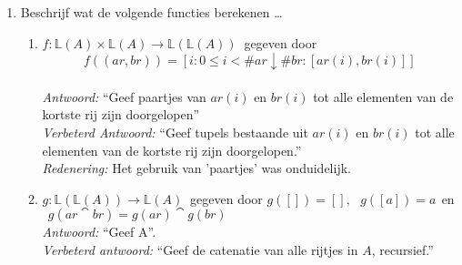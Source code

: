 
\begin{enumerate}

\item Beschrijf wat de volgende functies berekenen \ldots
\begin{enumerate}

    \item $f: \mathbb{L}(A) \times \mathbb{L}(A)\rightarrow \mathbb{L}(\mathbb{L}(A))~$ gegeven door \[f((ar,br))=[i : 0\leq i < \#ar\downarrow\#br : [ar(i),br(i)]]\] \\
        \emph{Antwoord:} ``Geef paartjes van $ar(i)$ en $br(i)$ tot alle elementen van de kortste rij zijn doorgelopen'' \\
        \emph{Verbeterd Antwoord:} ``Geef tupels bestaande uit $ar(i)$ en $br(i)$ tot alle elementen van de kortste rij zijn doorgelopen.'' \\
        \emph{Redenering:} Het gebruik van 'paartjes' was onduidelijk. \\

    \item $g:\mathbb{L}(\mathbb{L}(A))\rightarrow\mathbb{L}(A)~$ gegeven door \begin{math} g([ ]) = [ ],~~~g([a])=a~~ \end{math}en \begin{math} ~~g(ar \cat br)=g(ar) \cat g(br) \end{math}  \\
        \emph{Antwoord:} ``Geef A''. \\
        \emph{Verbeterd antwoord:} ``Geef de catenatie van alle rijtjes in $A$, recursief.'' \\


\end{enumerate}
\end{enumerate}
